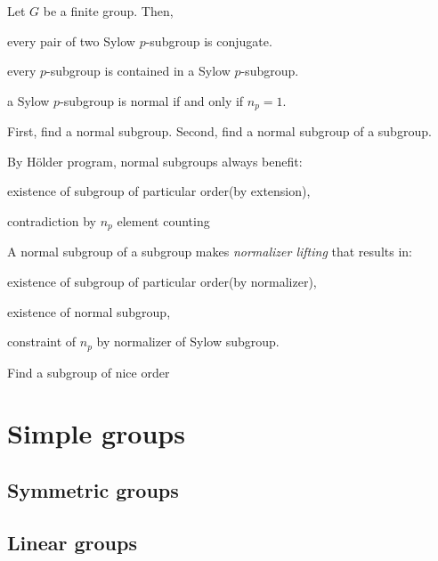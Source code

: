 \documentclass{../exp}
\begin{document}
\begin{cor}
Let $G$ be a finite group.
Then,
\begin{cond}
\item every pair of two Sylow $p$-subgroup is conjugate.
\item every $p$-subgroup is contained in a Sylow $p$-subgroup.
\item a Sylow $p$-subgroup is normal if and only if $n_p=1$.
\end{cond}
\end{cor}


First, find a normal subgroup.
Second, find a normal subgroup of a subgroup.

By H\"older program, normal subgroups always benefit:
\begin{cond}
\item existence of subgroup of particular order(by extension),
\item contradiction by $n_p$ element counting
\end{cond}
A normal subgroup of a subgroup makes \emph{normalizer lifting} that results in:
\begin{cond}
\item existence of subgroup of particular order(by normalizer),
\item existence of normal subgroup,
\item constraint of $n_p$ by normalizer of Sylow subgroup.
\end{cond}

Find a subgroup of nice order


\section{Simple groups}

\subsection{Symmetric groups}

\subsection{Linear groups}
\end{document}
